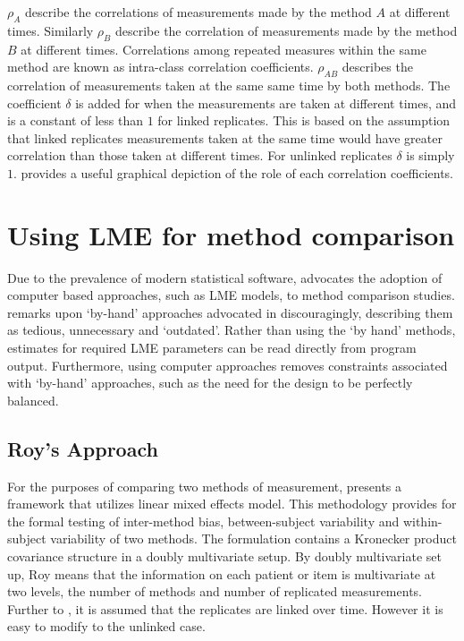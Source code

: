 \documentclass[MAIN.tex]{subfiles}
\begin{document}
	$\rho_{A}$ describe the correlations of measurements made by the method $A$ at different times. Similarly $\rho_{B}$ describe the correlation of measurements made by the method $B$ at different times. Correlations among repeated measures within the same method are known as intra-class correlation coefficients. $\rho_{AB}$ describes the correlation of measurements taken at the same same time by both methods. The coefficient $\delta$ is added for when the measurements are taken at different times, and is a constant of less than $1$ for linked replicates. This is based on the assumption that linked replicates measurements taken at the same time would have greater correlation than those taken at different times. For unlinked replicates $\delta$ is simply $1$. \citet{hamlett} provides a useful graphical depiction of the role of each correlation coefficients.
	
	\newpage
	\section{Using LME for method comparison}
	Due to the prevalence of modern statistical software, \citet{BXC2008} advocates the adoption of computer based approaches, such as LME models, to method comparison studies. \citet{BXC2008} remarks upon `by-hand' approaches advocated in \citet{BA99} discouragingly, describing them as tedious, unnecessary and `outdated'. Rather than using the `by hand' methods, estimates for required LME parameters can be read directly from program output. Furthermore, using computer approaches removes constraints associated with `by-hand' approaches, such as the need for the design to be perfectly balanced.
	
	\subsection{Roy's Approach}
	
	For the purposes of comparing two methods of measurement, \citet{roy} presents a framework that utilizes linear mixed effects model. This methodology provides for the formal testing of inter-method bias, between-subject variability and within-subject variability of two methods. The formulation contains a Kronecker product covariance structure in a doubly multivariate setup. By doubly multivariate set up, Roy means that the information on each patient or item is multivariate at two levels, the number of methods and number of replicated measurements. Further to \citet{lam}, it is assumed that the replicates are linked over time. However it is easy to modify to the unlinked case.
	
\end{document}
